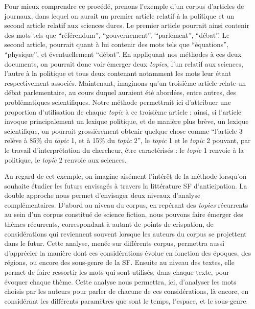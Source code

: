 \documentclass[letterpaper,portrait,12pt]{article}
\begin{document}
Pour mieux comprendre ce proc\'{e}d\'{e}, prenons l'exemple d'un corpus d'articles de journaux, dans lequel on aurait un premier article relatif \`{a} la politique et un second article relatif aux sciences dures. Le premier article pourrait ainsi contenir des mots tels que {``}r\'{e}f\'{e}rendum'', {``}gouvernement'', {``}parlement'', {``}d\'{e}bat''. Le second article, pourrait quant \`{a} lui contenir des mots tels que {``}\'{e}quations'', {``}physique'', et \'{e}ventuellement {``}d\'{e}bat''. En appliquant nos m\'{e}thodes \`{a} ces deux documents, on pourrait donc voir \'{e}merger deux \emph{topics}, l'un relatif aux sciences, l'autre \`{a} la politique et tous deux contenant notamment les mots leur \'{e}tant respectivement associ\'{e}s. Maintenant, imaginons qu'un troisi\`{e}me article relate un d\'{e}bat parlementaire, au cours duquel auraient \'{e}t\'{e} abord\'{e}es, entre autres, des probl\'{e}matiques scientifiques. Notre m\'{e}thode permettrait ici d'attribuer une proportion d'utilisation de chaque \emph{topic} \`{a} ce troisi\`{e}me article : ainsi, si l'article invoque principalement un lexique politique, et de mani\`{e}re plus br\`{e}ve, un lexique scientifique, on pourrait grossi\`{e}rement obtenir quelque chose comme {``}l'article 3 rel\`{e}ve \`{a} 85\% du \emph{topic} 1, et \`{a} 15\% du \emph{topic} 2'', le \emph{topic} 1 et le \emph{topic} 2 pouvant, par le travail d'interpr\'{e}tation du chercheur, \^{e}tre caract\'{e}ris\'{e}s : le \emph{topic} 1 renvoie \`{a} la politique, le \emph{topic} 2 renvoie aux sciences.





Au regard de cet exemple, on imagine ais\'{e}ment l'int\'{e}r\^{e}t de la m\'{e}thode lorsqu'on souhaite \'{e}tudier les futurs envisag\'{e}s \`{a} travers la litt\'{e}rature SF d'anticipation. La double approche nous permet d'envisager deux niveaux d'analyse compl\'{e}mentaires. D'abord au niveau du corpus, en rep\'{e}rant des \emph{topics} r\'{e}currents au sein d'un corpus constitu\'{e} de science fiction, nous pouvons faire \'{e}merger des th\`{e}mes r\'{e}currents, correspondant \`{a} autant de points de crispation, de consid\'{e}rations qui reviennent souvent lorsque les auteurs du corpus se projettent dans le futur. Cette analyse, men\'{e}e sur diff\'{e}rents corpus, permettra aussi d'appr\'{e}cier la mani\`{e}re dont ces consid\'{e}rations \'{e}volue en fonction des \'{e}poques, des r\'{e}gions, ou encore des sous-genre de la SF. Ensuite au niveau des textes, elle permet de faire ressortir les mots qui sont utilis\'{e}s, dans chaque texte, pour \'{e}voquer chaque th\`{e}me. Cette analyse nous permettra, ici, d'analyser les mots choisis par les auteurs pour parler de chacune de ces consid\'{e}rations, l\`{a} encore, en consid\'{e}rant les diff\'{e}rents param\`{e}tres que sont le temps, l'espace, et le sous-genre.
\end{document}

